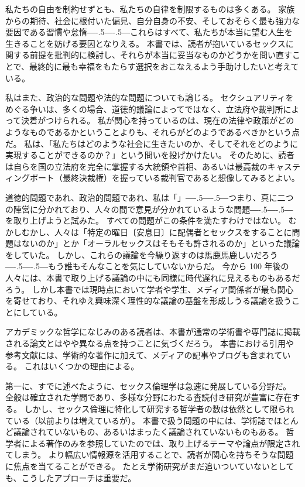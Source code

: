 \documentclass[paper=a4,book,openany]{jlreq}
\def\DDASH{―\kern-.5\zw―\kern-.5\zw―}
\begin{document}
私たちの自由を制約せずとも、私たちの自律を制限するものは多くある。
家族からの期待、社会に根付いた偏見、自分自身の不安、そしておそらく最も強力な要因である習慣や怠惰{\DDASH}これらはすべて、私たちが本当に望む人生を生きることを妨げる要因となりえる。
本書では、読者が抱いているセックスに関する前提を批判的に検討し、それらが本当に妥当なものかどうかを問い直すことで、最終的に最も幸福をもたらす選択をおこなえるよう手助けしたいと考えている。

私はまた、政治的な問題や法的な問題についても論じる。
セクシュアリティをめぐる争いは、多くの場合、道徳的議論によってではなく、立法府や裁判所によって決着がつけられる。
私が関心を持っているのは、現在の法律や政策がどのようなものであるかということよりも、それらがどのようであるべきかという点だ。
私は、「私たちはどのような社会に生きたいのか、そしてそれをどのように実現することができるのか？」という問いを投げかけたい。
そのために、読者は自らを国の立法府を完全に掌握する大統領や首相、あるいは最高裁のキャスティングボート（最終決裁権）を握っている裁判官であると想像してみるとよい。

道徳的問題であれ、政治的問題であれ、私は「」{\DDASH}つまり、真に二つの陣営に分かれており、人々の間で意見が分かれているような問題{\DDASH}を取り上げようと試みた。
すべての問題がこの条件を満たすわけではない。
むかしむかし、人々は「特定の曜日〔安息日〕に配偶者とセックスをすることに問題はないのか」とか「オーラルセックスはそもそも許されるのか」といった議論をしていた。
しかし、これらの議論を今繰り返すのは馬鹿馬鹿しいだろう{\DDASH}もう誰もそんなことを気にしていないからだ。
今から 100 年後の人々には、本書で取り上げる議論の中にも同様に時代遅れに見えるものもあるだろう。
しかし本書では現時点において学者や学生、メディア関係者が最も関心を寄せており、それゆえ興味深く理性的な議論の基盤を形成しうる議論を扱うことにしている。

アカデミックな哲学になじみのある読者は、本書が通常の学術書や専門誌に掲載される論文とはやや異なる点を持つことに気づくだろう。
本書における引用や参考文献には、学術的な著作に加えて、メディアの記事やブログも含まれている。
これはいくつかの理由による。

第一に、すでに述べたように、セックス倫理学は急速に発展している分野だ。
全般は確立された学問であり、多様な分野にわたる査読付き研究が豊富に存在する。
しかし、セックス倫理に特化して研究する哲学者の数は依然として限られている（以前よりは増えているが）。
本書で扱う問題の中には、学術誌でほとんど議論されていないもの、あるいはまったく議論されていないものもある。
哲学者による著作のみを参照していたのでは、取り上げるテーマや論点が限定されてしまう。
より幅広い情報源を活用することで、読者が関心を持ちそうな問題に焦点を当てることができる。
たとえ学術研究がまだ追いついていないとしても、こうしたアプローチは重要だ。
\end{document}
